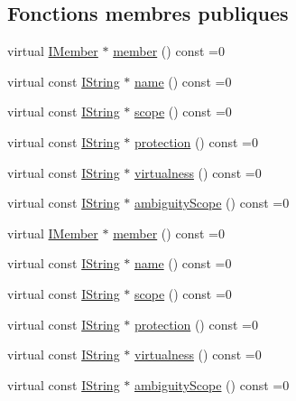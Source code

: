 \subsection*{Fonctions membres publiques}
\begin{DoxyCompactItemize}
\item 
virtual \hyperlink{class_i_member}{I\+Member} $\ast$ \hyperlink{class_i_member_reference_a01f99a2c58d76649441362337d4e5a4a}{member} () const  =0
\item 
virtual const \hyperlink{class_i_string}{I\+String} $\ast$ \hyperlink{class_i_member_reference_a5338b1385ff6d8381d5b0f6ed5637a33}{name} () const  =0
\item 
virtual const \hyperlink{class_i_string}{I\+String} $\ast$ \hyperlink{class_i_member_reference_af7d1d9f15b447edca6a73267e2c5d6ca}{scope} () const  =0
\item 
virtual const \hyperlink{class_i_string}{I\+String} $\ast$ \hyperlink{class_i_member_reference_a0154cc9b54a508c4cbe86e3cf122dbe6}{protection} () const  =0
\item 
virtual const \hyperlink{class_i_string}{I\+String} $\ast$ \hyperlink{class_i_member_reference_a7127a2750a818d404f43d65142bfc5f9}{virtualness} () const  =0
\item 
virtual const \hyperlink{class_i_string}{I\+String} $\ast$ \hyperlink{class_i_member_reference_abf7f167815ff5608e03b9324dfa7c18d}{ambiguity\+Scope} () const  =0
\item 
virtual \hyperlink{class_i_member}{I\+Member} $\ast$ \hyperlink{class_i_member_reference_a01f99a2c58d76649441362337d4e5a4a}{member} () const  =0
\item 
virtual const \hyperlink{class_i_string}{I\+String} $\ast$ \hyperlink{class_i_member_reference_a5338b1385ff6d8381d5b0f6ed5637a33}{name} () const  =0
\item 
virtual const \hyperlink{class_i_string}{I\+String} $\ast$ \hyperlink{class_i_member_reference_af7d1d9f15b447edca6a73267e2c5d6ca}{scope} () const  =0
\item 
virtual const \hyperlink{class_i_string}{I\+String} $\ast$ \hyperlink{class_i_member_reference_a0154cc9b54a508c4cbe86e3cf122dbe6}{protection} () const  =0
\item 
virtual const \hyperlink{class_i_string}{I\+String} $\ast$ \hyperlink{class_i_member_reference_a7127a2750a818d404f43d65142bfc5f9}{virtualness} () const  =0
\item 
virtual const \hyperlink{class_i_string}{I\+String} $\ast$ \hyperlink{class_i_member_reference_abf7f167815ff5608e03b9324dfa7c18d}{ambiguity\+Scope} () const  =0
\end{DoxyCompactItemize}


